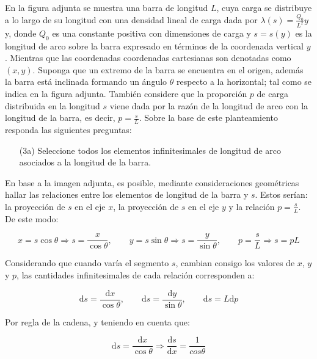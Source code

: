 \documentclass[a4paper,10pt]{article}
\begin{document}
En la figura adjunta se muestra una barra de longitud
$L$, cuya carga se distribuye a lo largo de su longitud con una densidad lineal
de carga dada por $\lambda(s)=\frac{Q_{0}}{L^{2}}y$
y, donde $Q_{0}$ es una constante positiva con dimensiones
de carga y $s=s(y)$ es la longitud de arco sobre la barra expresado
en términos de la coordenada vertical $y$. Mientras que las coordenadas coordenadas
cartesianas son denotadas como $(x,y)$. Suponga que un extremo de
la barra se encuentra en el origen, además la barra está inclinada formando
un ángulo $\theta$ respecto a la horizontal; tal como se indica en la figura adjunta. También considere que la
proporción $p$ de carga distribuida en la longitud $s$ viene dada por la razón de la longitud de arco con la
longitud de la barra, es decir, $p=\frac{s}{L}$.
Sobre la base de este planteamiento responda las siguientes preguntas:

\begin{itemize}
    \item[(3a)] Seleccione todos los elementos infinitesimales de longitud de arco asociados a la longitud de la
    barra.
\end{itemize}

En base a la imagen adjunta, es posible, mediante consideraciones geom\'etricas
hallar las relaciones entre los elementos de longitud de la barra y $s$. Estos
ser\'ian: la proyecci\'on de $s$ en el eje $x$, la proyecci\'on de $s$ en el eje
$y$ y la relaci\'on $p=\frac{s}{L}$. De este modo:

\begin{equation*}
    x=s\cos\theta\Longrightarrow s=\frac{x}{\cos\theta},\qquad
    y=s\sin\theta\Longrightarrow s=\frac{y}{\sin\theta},\qquad
    p=\frac{s}{L}\Longrightarrow s=pL
\end{equation*}

Considerando que cuando varía el segmento $s$, cambian consigo los valores
de $x$, $y$ y $p$, las cantidades infinitesimales de cada relaci\'on
corresponden a:

\begin{equation*}
    \boxed{\mathrm{d}s=\frac{\mathrm{d}x}{\cos\theta}},\qquad
    \boxed{\mathrm{d}s=\frac{\mathrm{d}y}{\sin\theta}},\qquad
    \boxed{\mathrm{d}s=L\mathrm{d}p}
\end{equation*}

Por regla de la cadena, y teniendo en cuenta que:

\begin{equation*}
    \mathrm{d}s=\frac{\mathrm{d}x}{\cos\theta}
    \Longrightarrow\frac{\mathrm{d}s}{\mathrm{d}x}=\frac{1}{cos\theta}
\end{equation*}
\end{document}
